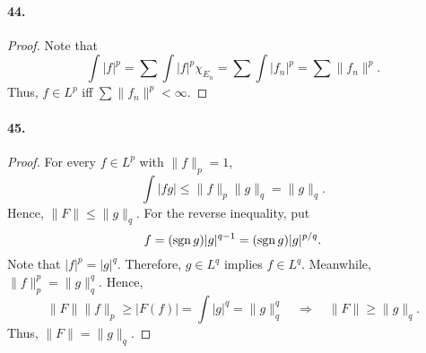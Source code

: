   \paragraph{44.}
  \begin{proof}
    Note that
    \[
      \int|f|^p=\sum\int|f|^p\chi_{E_n}=\sum\int|f_n|^p=\sum\|f_n\|^p.
    \]
    Thus, $f\in L^p$ iff $\sum\|f_n\|^p<\infty$.
  \end{proof}
  
  \paragraph{45.}
  \begin{proof}
    For every $f\in L^p$ with $\|f\|_p=1$,
    \[
      \int|fg|\le \|f\|_p\|g\|_q = \|g\|_q.
    \]
    Hence, $\|F\|\le\|g\|_q$. For the reverse inequality, put
    \[
      f=(\operatorname{sgn} g)|g|^{q-1}=(\operatorname{sgn} g)|g|^{p/q}.
    \]
    Note that $|f|^p=|g|^q$. Therefore, $g\in L^q$ implies $f\in L^q$. 
    Meanwhile, $\|f\|_p^p=\|g\|_q^q$. Hence, 
    \[
      \|F\|\|f\|_p \ge |F(f)| = \int|g|^q = \|g\|_q^q
      \quad\Rightarrow\quad
      \|F\|\ge\|g\|_q.
    \]
    Thus, $\|F\|=\|g\|_q$.
  \end{proof}











